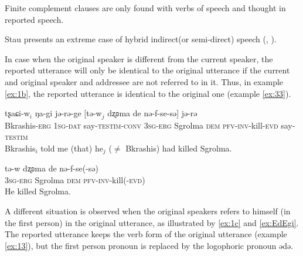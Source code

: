 \documentclass[oneside,a4paper,11pt]{article}
\newcommand{\ipa}[1]{{\phon #1}} %
\newcommand{\ipapl}[1]{{\phon #1}} %
\newcommand{\conv}{\textsc{conv}}
\newcommand{\dat}{\textsc{dat}}
\newcommand{\dem}{\textsc{dem}}
\newcommand{\evid}{\textsc{evd}}
\newcommand{\erg}{\textsc{erg}}
\newcommand{\inv}{\textsc{inv}}
\newcommand{\prf}{\textsc{pfv}}
\newcommand{\sg}{\textsc{sg}}
\newcommand{\testim}{\textsc{testim}}
\begin{document}
%
% 
%		
%
%
%		
%		

Finite complement clauses are only found with verbs of speech and thought in reported speech.



Stau presents an extreme case of hybrid indirect(or semi-direct)  speech  (\citealt{aikhenvald08semidirect}, \citealt{tournadre08conjunct}). 

In case when the original speaker is different from the current speaker, the reported utterance will only be identical to the original utterance if the current and original speaker and addressee are not referred to in it. Thus, in example \ref{ex:1b}, the reported utterance is identical to the original one (example \ref{ex:33}).


\begin{exe}
\ex \label{ex:1b}
\gll
	\ipa{tʂaɕi-w}$_i$ \ipa{ŋa-gi}	\ipa{jə-rə-ge} [\ipapl{tə-w}$_j$	\ipapl{dʐʚma} 	\ipapl{de} \ipapl{nə-f-se-sə}] \ipa{jə-rə}  \\
	{Bkrashis-\erg} {1\sg-\dat} {say-\testim-\conv} {3\sg-\erg} Sgrolma {\dem} {\prf-\inv-kill-\evid}  say-\testim\\ 
	\glt Bkrashis$_i$ told me (that) he$_j$ ($\ne$ Bkrashis) had killed Sgrolma.
\end{exe}


\begin{exe}
\ex \label{ex:33}
\gll
	\ipa{tə-w} \ipapl{dʐʚma} \ipapl{de} \ipapl{nə-f-se(-sə)} \\
	{3\sg-\erg} Sgrolma {\dem} {\prf-\inv-kill(-\evid)}\\ 
	\glt He killed Sgrolma.
\end{exe}

A different situation is observed when the original speakers refers to himself (in the first person) in the original utterance, as illustrated by \ref{ex:1c} and \ref{ex:EdEgi}.  The reported utterance keeps the verb form of the original utterance (example \ref{ex:13}), but the first person pronoun is replaced by the logophoric pronoun \ipa{ədə}. 
\end{document}
